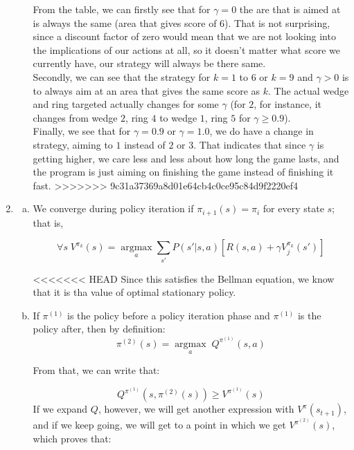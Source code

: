 \documentclass{article}
\begin{document}
\begin{enumerate}
\begin{enumerate}[(a)]
                From the table, we can firstly see that for $\gamma=0$ the are that is aimed at is always the same (area that gives score of $6$). That is not surprising, since a discount factor of zero would mean that we are not looking into the implications of our actions at all, so it doesn't matter what score we currently have, our strategy will always be there same.\\

                Secondly, we can see that the strategy for $k=1$ to $6$ or $k=9$ and $\gamma>0$ is to always aim at an area that gives the same score as $k$. The actual wedge and ring targeted actually changes for some $\gamma$ (for $2$, for instance, it changes from wedge $2$, ring $4$ to wedge $1$, ring $5$ for $\gamma\ge0.9$).\\

                Finally, we see that for $\gamma=0.9$ or $\gamma=1.0$, we do have a change in strategy,  aiming to $1$ instead of $2$ or $3$. That indicates that since $\gamma$ is getting higher, we care less and less about how long the game lasts, and the program is just aiming on finishing the game instead of finishing it fast.
>>>>>>> 9c31a37369a8d01e64cb4c0ce95c84d9f2220ef4
            \end{enumerate}        

        \newpage
        \item
            \begin{enumerate}[(a)]
                \item We converge during policy iteration if $\pi_{i+1}(s) = \pi_{i}$ for every state $s$; that is, 

                $$\forall s \; V^{\pi_k}(s) = \underset{a}{\operatorname{argmax}} \sum_{s'} P(s' | s, a) [R(s, a) + \gamma V_j^{\pi_k}(s')]$$

<<<<<<< HEAD
                Since this satisfies the Bellman equation, we know that it is tha value of optimal stationary policy.
                \item If $\pi^{(1)}$ is the policy before a policy iteration phase and $\pi^{(1)}$ is the policy after, then by definition: $$\pi^{(2)}(s) = \underset{a}{\operatorname{argmax}} \; Q^{\pi^{(1)}}(s, a)$$
                
               From that, we can write that:
               
               $$Q^{\pi^{(1)}}(s, \pi^{(2)}(s))\geq V^{\pi^{(1)}}(s)$$
 If we expand $Q$, however, we will get another expression with $V^{\pi}(s_{t+1})$, and if we keep going, we will get to a point in which we get $V^{\pi^{(2)}}(s)$, which proves that:
 

\end{enumerate}
\end{enumerate}
\end{document}

